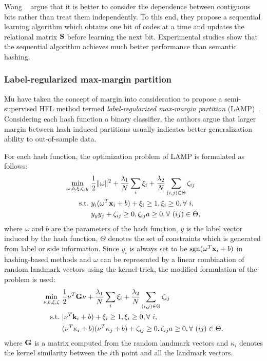 Wang \etal~\cite{wang2010icml} argue that it is better to consider the dependence between contiguous bits rather than treat them independently. To this end, they propose a sequential learning algorithm which obtains one bit of codes at a time and updates the relational matrix $ \S $ before learning the next bit. Experimental studies show that the sequential algorithm achieves much better performance than semantic hashing.

\subsubsection{Label-regularized max-margin partition}
Mu \etal have taken the concept of margin into consideration to propose a semi-supervised \mbox{HFL} method termed \textit{label-regularized max-margin partition} (\mbox{LAMP})~\cite{mu2010cvpr}. Considering each hash function a binary classifier, the authors argue that larger margin between hash-induced partitions usually indicates better generalization ability to out-of-sample data.

For each hash function, the optimization problem of \mbox{LAMP} is formulated as follows:
\begin{align}
\min_{\omega,b, \xi,\zeta,y}&~\frac{1}{2}\|\omega\|^2+\frac{\lambda_1}{N}\sum_{i}\xi_i+\frac{\lambda_2}{N}\sum_{(i,j)\in\Theta}\zeta_{ij}\nonumber\\
\subto&~y_i(\omega^T\x_i+b)+\xi_i\ge1,\xi_i\ge0, \forall ~i,\nonumber\\
&~y_yy_j+\zeta_{ij}\ge0,\zeta_{ij}a\ge0,\forall ~(ij)\in\Theta\nonumber,
\end{align}
where $ \omega $ and $ b $ are the parameters of the hash function, $ y $ is the label vector induced by the hash function, $ \Theta $ denotes the set of constraints which is generated from label or side information. Since $ y_i $ is always set to be $ \sgn(\omega^T\x_i+b) $ in hashing-based methods and $ \omega $ can be represented by a linear combination of random landmark vectors using the kernel-trick, the modified formulation of the problem is used:
\begin{align}
\label{SSLTH:LAMP}
\min_{\nu,b, \xi,\zeta}&~\frac{1}{2}\nu^T\G\nu+\frac{\lambda_1}{N}\sum_{i}\xi_i+\frac{\lambda_2}{N}\sum_{(i,j)\in\Theta}\zeta_{ij}\\
\subto&~|\nu^T\k_i+b)+\xi_i\ge1,\xi_i\ge0, \forall ~i,\nonumber\\
&~(\nu^T\kappa_i+b)(\nu^T\kappa_j+b)+\zeta_{ij}\ge0,\zeta_{ij}a\ge0,\forall ~(ij)\in\Theta\nonumber,
\end{align}
where $ \G $ is a matrix computed from the random landmark vectors and $ \kappa_i $ denotes the kernel similarity between the $ i $th point and all the landmark vectors.

